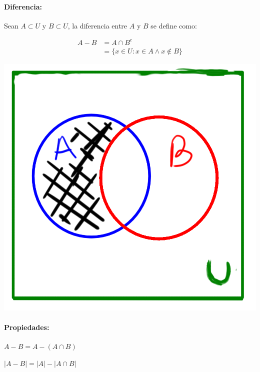 \paragraph{Diferencia: }
Sean $A\subset U$ y $B\subset U$, la diferencia entre $A$ y $B$ se define como:
        \begin{center}
    \begin{minipage}{0.4\textwidth}
        \begin{align*}
            A - B &= A \cap B^c \\ &= \{x\in U : x\in A \land x\notin B\}
        \end{align*}
    \end{minipage}
    \begin{minipage}{0.4\textwidth}
         \includegraphics[scale=0.3]{imagenes/difference.png}
    \end{minipage}
    \end{center}
    
\paragraph{Propiedades:}
    \begin{itemize}
    \begin{multicols}{2}
    \item $A - B = A - (A\cap B)$
    \item $|A-B| = |A| - |A\cap B|$    
    \end{multicols}
    \end{itemize}
    
